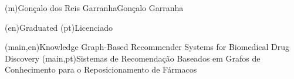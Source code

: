 
%



\ncauthorname(m){Gonçalo dos Reis Garranha}{Gonçalo Garranha}


\ncauthordegree(en){Graduated} 
\ncauthordegree(pt){Licenciado}




\nctitle(main,en){Knowledge Graph-Based Recommender Systems for Biomedical Drug Discovery}%
\nctitle(main,pt){Sistemas de Recomendação Baseados em Grafos de Conhecimento para o Reposicionamento de Fármacos}%

